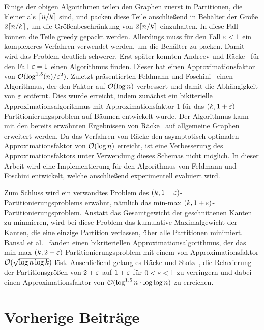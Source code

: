 Einige der obigen Algorithmen teilen den Graphen zuerst in Partitionen, die kleiner als $\lceil n/k\rceil$ sind, und packen diese Teile anschließend in Behälter der Größe $2 \lceil n/k\rceil$, um die Größenbeschränkung von $2 \lceil n/k\rceil$ einzuhalten.
In diese Fall können die Teile greedy gepackt werden.
Allerdings muss für den Fall $\varepsilon < 1$ ein komplexeres Verfahren verwendet werden, um die Behälter zu packen. 
Damit wird das Problem deutlich schwerer.
Erst später konnten Andreev und Räcke~\cite{ar06} für den Fall $\varepsilon = 1$ einen Algorithmus finden.
Dieser hat einen Approximationsfaktor von $\mathcal{O}(\log^{1.5}(n)/\varepsilon^2)$.
Zuletzt präsentierten Feldmann und Foschini~\cite{ff13} einen Algorithmus, der den Faktor auf $\mathcal{O}(\log n)$ verbessert und damit die Abhängigkeit von $\varepsilon$ entfernt.
Dies wurde erreicht, indem zunächst ein bikiterielle Approximationsalgorithmus mit Approximationsfaktor $1$ für das $(k,1+\varepsilon)$\hyp Partitionierungsproblem auf Bäumen entwickelt wurde.
Der Algorithmus kann mit den bereits erwähnten Ergebnissen von Räcke~\cite{rc08} auf allgemeine Graphen erweitert werden.
Da das Verfahren von Räcke den asymptotisch optimalen Approximationsfaktor von $\mathcal{O}(\log n)$ erreicht, ist eine Verbesserung des Approximationsfaktors unter Verwendung dieses Schemas nicht möglich.
In dieser Arbeit wird eine Implementierung für den Algorithmus von Feldmann und Foschini entwickelt, welche anschließend experimentell evaluiert wird.

Zum Schluss wird ein verwandtes Problem des $(k, 1+\varepsilon)$\hyp Partitionierungsproblems erwähnt, nämlich das min-max $(k, 1+\varepsilon)$\hyp Partitionierungsproblem.
Anstatt das Gesamtgewicht der geschnittenen Kanten zu minmieren, wird bei diese Problem das kumulative Maximalgewicht der Kanten, die eine einzige Partition verlassen, über alle Partitionen minimiert.
Bansal et al.~\cite{BFK+11} fanden einen bikriteriellen Approximationsalgorithmus, der das min-max $(k, 2 + \varepsilon)$\hyp Partitionierungsproblem mit einem von Approximationsfaktor $\mathcal{O}(\sqrt{\log n \log k})$ löst.
Anschließend gelang es Räcke und Stotz~\cite{RS16}, die Relaxierung der Partitionsgrößen von $2 + \varepsilon$ auf $1 + \varepsilon$ für $0 < \varepsilon < 1$ zu verringern und dabei einen Approximationsfaktor von $\mathcal{O}(\log^{1.5} n \cdot \log \log n)$ zu erreichen.
\section{Vorherige Beiträge}
